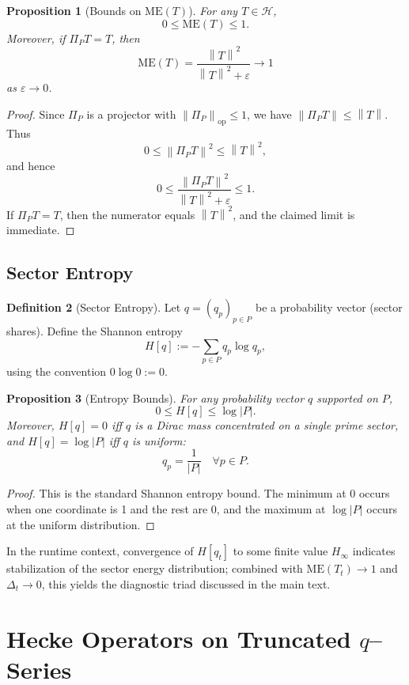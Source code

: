 \documentclass[11pt]{article}
\theoremstyle{definition}
\newtheorem{definition}{Definition}[section]
\theoremstyle{plain}
\newtheorem{proposition}[definition]{Proposition}
\theoremstyle{remark}
\newcommand{\Hcal}{\mathcal{H}}
\newcommand{\norm}[1]{\left\lVert #1 \right\rVert}
\begin{document}
\begin{proposition}[Bounds on \(\mathrm{ME}(T)\)]
For any \(T \in \Hcal\),
\[
  0 \le \mathrm{ME}(T) \le 1.
\]
Moreover, if \(\Pi_P T = T\), then
\[
  \mathrm{ME}(T) = \frac{\norm{T}^2}{\norm{T}^2 + \varepsilon} \to 1
\]
as \(\varepsilon \to 0\).
\end{proposition}

\begin{proof}
Since \(\Pi_P\) is a projector with \(\norm{\Pi_P}_{\mathrm{op}}\le 1\), we have \(\norm{\Pi_P T} \le \norm{T}\).
Thus
\[
  0 \le \norm{\Pi_P T}^2 \le \norm{T}^2,
\]
and hence
\[
  0 \le \frac{\norm{\Pi_P T}^2}{\norm{T}^2 + \varepsilon} \le 1.
\]
If \(\Pi_P T = T\), then the numerator equals \(\norm{T}^2\), and the claimed limit is immediate.
\end{proof}

\subsection{Sector Entropy}

\begin{definition}[Sector Entropy]
Let \(q = (q_p)_{p\in P}\) be a probability vector (sector shares).
Define the Shannon entropy
\[
  H[q] := -\sum_{p\in P} q_p \log q_p,
\]
using the convention \(0\log 0 := 0\).
\end{definition}

\begin{proposition}[Entropy Bounds]
For any probability vector \(q\) supported on \(P\),
\[
  0 \le H[q] \le \log |P|.
\]
Moreover, \(H[q]=0\) iff \(q\) is a Dirac mass concentrated on a single prime sector, and \(H[q]=\log |P|\) iff \(q\) is uniform:
\[
  q_p = \frac{1}{|P|} \quad \forall p\in P.
\]
\end{proposition}

\begin{proof}
This is the standard Shannon entropy bound.
The minimum at 0 occurs when one coordinate is 1 and the rest are 0, and the maximum at \(\log|P|\) occurs at the uniform distribution.
\end{proof}

In the runtime context, convergence of \(H[q_t]\) to some finite value \(H_\infty\) indicates stabilization of the sector energy distribution; combined with \(\mathrm{ME}(T_t)\to 1\) and \(\Delta_t\to 0\), this yields the diagnostic triad discussed in the main text.

\section{Hecke Operators on Truncated $q$--Series}
\end{document}
